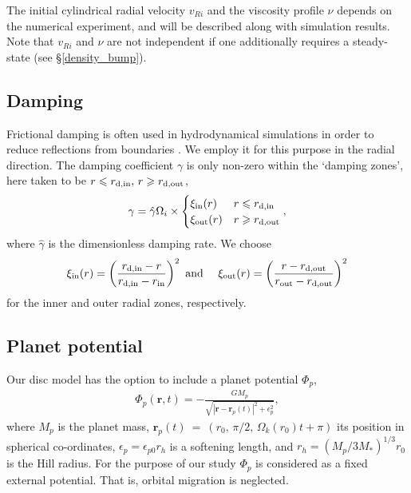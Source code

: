 The initial cylindrical radial velocity $v_{Ri}$ and the viscosity
profile $\nu$ depends on the numerical experiment, and will be
described along with simulation results. Note that $v_{Ri}$ and $\nu$
are not independent if one additionally requires a steady-state (see
\S\ref{density_bump}).    

\subsection{Damping}
Frictional damping is often used in hydrodynamical simulations in order
to reduce reflections from boundaries
\citep[e.g.][]{bate02,valborro07}. We employ it for this  
purpose in the radial direction. The damping coefficient $\gamma$ is only 
non-zero within the `damping zones', here taken to be $r\leqslant r_\mathrm{d,in},\, 
r\geqslant r_\mathrm{d,out}$, 
\begin{align}
  \gamma = \hat{\gamma}\Omega_i\times
  \begin{cases}
    \xi_\mathrm{in}(r) & r\leqslant r_\mathrm{d,in} \\
    \xi_\mathrm{out}(r) & r\geqslant r_\mathrm{d,out} \\
  \end{cases},
\end{align}
where $\hat{\gamma}$ is the dimensionless damping rate. We choose
\begin{align}
\xi_\mathrm{in}(r) = \left(\frac{r_\mathrm{d,in} - r}{r_\mathrm{d,in} - r_\mathrm{in}}\right)^2 \text{ and } \quad
\xi_\mathrm{out}(r) = \left(\frac{r - r_\mathrm{d,out}}{r_\mathrm{out}- r_\mathrm{d,out}}\right)^2
\end{align}
for the inner and outer radial zones, respectively. 

\subsection{Planet potential}\label{planet}
Our disc model has the option to include a planet potential $\Phi_p$,
\begin{align}
  \Phi_p(\bm{r},t) = -\frac{GM_p}{\sqrt{|\bm{r}-\bm{r}_p(t)|^2 + \epsilon^2_p}},
\end{align}
where $M_p$ is the planet mass,
$\bm{r}_p(t)~=~(r_0,\,\pi/2,\,\Omega_k(r_0)t+\pi)$ its position in
spherical co-ordinates, $\epsilon_p = \epsilon_{p0}r_h$ is a
softening length, and $r_h=(M_p/3M_*)^{1/3}r_0$ is the Hill radius. 
For the purpose of our study $\Phi_p$ is considered as a 
fixed external potential. That is, orbital migration is neglected. 
